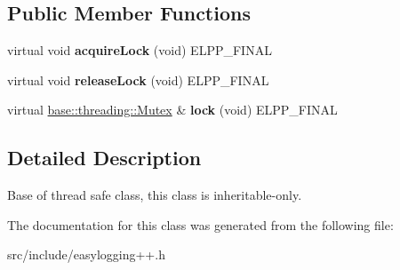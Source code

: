 \subsection*{Public Member Functions}
\begin{DoxyCompactItemize}
\item 
\mbox{\label{classel_1_1base_1_1threading_1_1_thread_safe_a59db719b214f7118f0919846a85077bf}} 
virtual void {\bfseries acquire\+Lock} (void) E\+L\+P\+P\+\_\+\+F\+I\+N\+AL
\item 
\mbox{\label{classel_1_1base_1_1threading_1_1_thread_safe_a95bb166242b9691f861274a9b8ced2d9}} 
virtual void {\bfseries release\+Lock} (void) E\+L\+P\+P\+\_\+\+F\+I\+N\+AL
\item 
\mbox{\label{classel_1_1base_1_1threading_1_1_thread_safe_affb45b35790a7305d0a659562c8104fc}} 
virtual \hyperlink{classel_1_1base_1_1threading_1_1internal_1_1_no_mutex}{base\+::threading\+::\+Mutex} \& {\bfseries lock} (void) E\+L\+P\+P\+\_\+\+F\+I\+N\+AL
\end{DoxyCompactItemize}


\subsection{Detailed Description}
Base of thread safe class, this class is inheritable-\/only. 

The documentation for this class was generated from the following file\+:\begin{DoxyCompactItemize}
\item 
src/include/easylogging++.\+h\end{DoxyCompactItemize}
